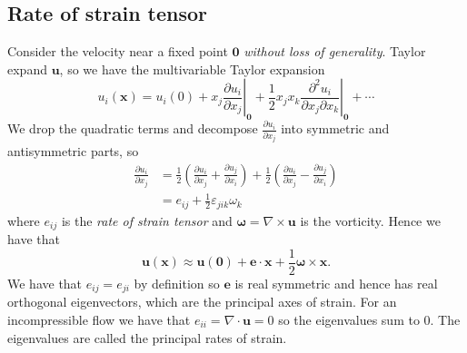 \documentclass{article}
\begin{document}
\subsection{Rate of strain tensor}
Consider the velocity near a fixed point $ \mathbf 0 $ \textit{without loss of generality}. Taylor expand $ \mathbf u $, so we have the multivariable Taylor expansion
\[
	u_i(\mathbf x) = u_i(0) + x_j\left.\frac{\partial u_i}{\partial x_j} \right|_{\mathbf 0} + \frac 12 x_jx_k\left.\frac{\partial^2 u_i}{\partial x_j\partial x_k}\right|_{\mathbf 0} + \cdots
\]
We drop the quadratic terms and decompose $ \frac{\partial u_i}{\partial x_j} $ into symmetric and antisymmetric parts, so
\begin{align*}
	\frac{\partial u_i}{\partial x_j} &= \frac 12 \left(\frac{\partial u_i}{\partial x_j} + \frac{\partial u_j}{\partial x_i}\right) + \frac 12 \left(\frac{\partial u_i}{\partial x_j}-\frac{\partial u_j}{\partial x_i}\right) \\
					  &= e_{ij} + \frac 12 \varepsilon_{jik} \omega_k
\end{align*}
where $ e_{ij} $ is the \textit{rate of strain tensor} and $ \boldsymbol\omega = \nabla\times \mathbf u  $ is the vorticity. Hence we have that
\[
  \mathbf u (\mathbf x) \approx \mathbf u (\mathbf 0) + \mathbf e \cdot \mathbf x + \frac 12 \boldsymbol \omega \times \mathbf x.
\]
We have that $ e_{ij}= e_{ji} $ by definition so $ \mathbf e $ is real symmetric and hence has real orthogonal eigenvectors, which are the principal axes of strain. For an incompressible flow we have that $ e_{ii} = \nabla\cdot\mathbf u = 0 $ so the eigenvalues sum to $ 0 $. The eigenvalues are called the principal rates of strain.
\end{document}
